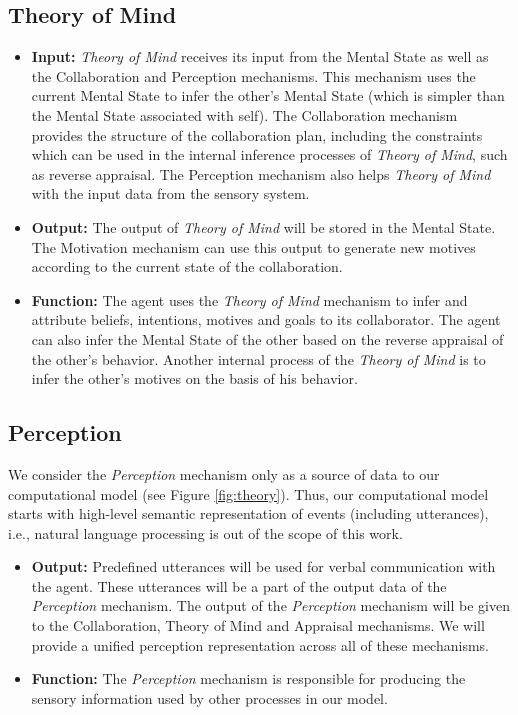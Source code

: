 \documentclass[12pt]{report}
\begin{document}
\subsection{Theory of Mind}
\label{sec:}
\begin{itemize}
  \item \textbf{Input:} \textit{Theory of Mind} receives its input from the
  Mental State as well as the Collaboration and Perception mechanisms. This
  mechanism uses the current Mental State to infer the other's Mental State
  (which is simpler than the Mental State associated with self). The
  Collaboration mechanism provides the structure of the collaboration plan,
  including the constraints which can be used in the internal inference
  processes of \textit{Theory of Mind}, such as reverse appraisal. The
  Perception mechanism also helps \textit{Theory of Mind} with the input data
  from the sensory system.
  
  \item \textbf{Output:} The output of \textit{Theory of Mind} will be stored in
  the Mental State. The Motivation mechanism can use this output to generate
  new motives according to the current state of the collaboration.
  
  \item \textbf{Function:} The agent uses the \textit{Theory of Mind} mechanism
  to infer and attribute beliefs, intentions, motives and goals to its
  collaborator. The agent can also infer the Mental State of the other based on
  the reverse appraisal of the other's behavior. Another internal process of
  the \textit{Theory of Mind} is to infer the other's motives on the basis of
  his behavior.
\end{itemize}

\subsection{Perception}

We consider the \textit{Perception} mechanism only as a source of data to our
computational model (see Figure \ref{fig:theory}). Thus, our computational
model starts with high-level semantic representation of events (including
utterances), i.e., natural language processing is out of the scope of this work.

\begin{itemize}
  \item \textbf{Output:} Predefined utterances will be used for verbal
  communication with the agent. These utterances will be a part of the output
  data of the \textit{Perception} mechanism. The output of the
  \textit{Perception} mechanism will be given to the Collaboration, Theory of
  Mind and Appraisal mechanisms. We will provide a unified perception
  representation across all of these mechanisms.
  
  \item \textbf{Function:} The \textit{Perception} mechanism is responsible for
  producing the sensory information used by other processes in our model.
\end{itemize}
\end{document}
